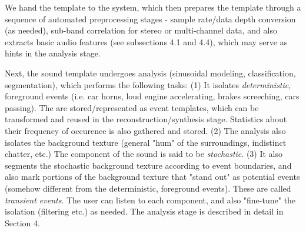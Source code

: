 \documentclass{acmsiggraph}               %
\begin{document}

We hand the template to the system, which then prepares the template 
through a sequence of automated preprocessing stages - sample rate/data 
depth conversion (as needed), sub-band correlation for stereo or 
multi-channel data, and also extracts basic audio features (see 
subsections 4.1 and 4.4), which may serve as hints in the analysis stage.

Next, the sound template undergoes analysis (sinusoidal modeling, 
classification, segmentation), which performs the following tasks:
(1) It isolates \textit{deterministic}, foreground events (i.e. car horns, loud 
engine accelerating, brakes screeching, cars passing).  The are 
stored/represented as event templates, which can be transformed and
reused in the reconstruction/synthesis stage.  Statistics about their frequency 
of occurence is also gathered and stored.
(2) The analysis also isolates the background texture (general "hum" of the surroundings,
indistinct chatter, etc.)  The component of the sound is said to be 
\textit{stochastic}.
(3) It also segments the stochastic background texture according to 
event boundaries, and also mark portions of the background texture that 
"stand out" as potential events (somehow different from the 
deterministic, foreground events).  These are called \textit{transient
events}.  The user can listen to each component, and also 
"fine-tune" the isolation (filtering etc.) as needed.  The analysis stage is 
described in detail in Section 4.

\end{document}
